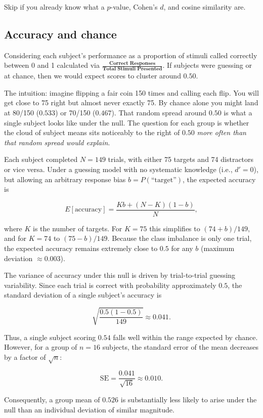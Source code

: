 \documentclass[11pt]{article}
\begin{document}
Skip if you already know what a $p$-value, Cohen's $d$, and cosine
similarity are.

\subsection{Accuracy and chance}
Considering each subject's performance as a proportion of stimuli called correctly between 0 and 1 calculated via $\frac{\textbf{Correct Responses}}{\textbf{Total Stimuli Presented}}$. 
If subjects were guessing or at chance, then we would expect scores to cluster around $0.50$.

The intuition: imagine flipping a fair coin 150 times and calling each
flip. You will get close to 75 right but almost never exactly 75. By
chance alone you might land at 80/150 ($0.533$) or 70/150 ($0.467$).
That random spread around $0.50$ is what a single subject looks like
under the null. The question for each group is whether the cloud of
subject means sits noticeably to the right of $0.50$ \emph{more often
than that random spread would explain}.

Each subject completed $N = 149$ trials, with either 75 targets and 74 distractors or vice versa. 
Under a guessing model with no systematic knowledge (i.e., $d' = 0$), but allowing an arbitrary response bias $b = P(\text{``target''})$, 
the expected accuracy is

\[
E[\text{accuracy}] = \frac{K b + (N-K)(1-b)}{N},
\]

where $K$ is the number of targets. For $K = 75$ this simplifies to $(74 + b)/149$, and for $K = 74$ to $(75 - b)/149$. 
Because the class imbalance is only one trial, the expected accuracy remains extremely close to $0.5$ for any $b$ 
(maximum deviation $\approx 0.003$).

The variance of accuracy under this null is driven by trial-to-trial guessing variability. Since each trial is correct with probability 
approximately $0.5$, the standard deviation of a single subject's accuracy is

\[
\sqrt{\frac{0.5(1-0.5)}{149}} \approx 0.041.
\]

Thus, a single subject scoring $0.54$ falls well within the range expected by chance. However, for a group of $n = 16$ subjects, 
the standard error of the mean decreases by a factor of $\sqrt{n}$:

\[
\text{SE} = \frac{0.041}{\sqrt{16}} \approx 0.010.
\]

Consequently, a group mean of $0.526$ is substantially less likely to arise under the null than an individual deviation of similar magnitude.
\end{document}
